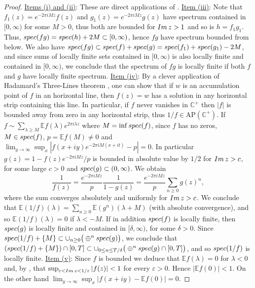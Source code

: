 \documentclass[a4paper,reqno,12pt]{amsart}
\newcommand{\E}{\mathcal{E}}
\renewcommand{\H}{\mathbb{C}^+}
\newcommand{\im}{{\rm Im}\,}
\newcommand{\la}{\lambda}
\newcommand{\ep}{\varepsilon}
\newcommand{\1}{{\bf 1}}
\newcommand{\apc}{\mathrm{AP}(\H)}
\renewcommand{\E}{\mathbb{E}}
\renewcommand{\1}{{\bo 1}}
\renewcommand{\Im}{{\rm Im}\,}
\newcommand{\spec}{{\rm spec}}
\begin{document}
\begin{proof}
\noindent \underline{Items (i) and (ii)}: These are direct applications of \cite[Thm. p. 162 \& p. 152]{Be}. \underline{Item (iii)}: Note that $f_1(z)=e^{-2\pi i M z}f(z)$ and $g_1(z)=e^{-2\pi i M z}g(z)$ have spectrum contained in $[0,\infty)$ for some $M>0$, thus both are bounded for $\Im z>1$ and so is $h=f_1g_1$. Thus, $\spec(fg)=\spec(h)+2M\subset [0,\infty)$, hence $fg$ have spectrum bounded from below. We also have $\spec(fg)\subset\spec(f)+\spec(g)=\spec(f_1)+\spec(g_1)-2M$, and since sums of locally finite sets contained in $[0,\infty)$ is also locally finite and contained in $[0,\infty)$, we conclude that the spectrum of $fg$ is locally finite if both $f$ and $g$ have locally finite spectrum. \underline{Item (iv)}: By a clever application of Hadamard's Three-Lines theorem  \cite[ Thm. 11, p. 139 \& Thm. 9, p. 144]{Be}, one can show that if $w$ is an accumulation point of $f$ in an horizontal line, then $f(z)=w$ has a solution in any horizontal strip containing this line.  In particular, if $f$ never vanishes in $\H$ then $|f|$ is bounded away from zero in any horizontal strip, thus $1/f\in \apc$. If $f\sim \sum_{\la\geq M} \E f(\la)e^{2\pi i\la z}$ where $M=\inf \spec(f)$, 
since $f$ has no zeros, $M\in \spec(f)$, $p=\E f(M)\neq 0$ and $\lim_{y\to \infty} \sup_x |f(x+iy)e^{-2\pi iM (x+it)}-p|=0$. In particular $g(z)=1-f(z)e^{-2\pi iM z}/p$ is bounded in absolute value by $1/2$ for $\im z> c$, for some large $c>0$ and $\spec(g)\subset (0,\infty)$. We obtain
$$
\frac{1}{f(z)} = \frac{e^{-2\pi iM z}}{p}\frac{1}{1-g(z)} = \frac{e^{-2\pi iM z}}{p} \sum_{n \geq 0} g(z)^n,
$$
where the sum converges absolutely and uniformly for $\Im z>c$. We conclude that $\E (1/f)(\la) = \sum_{n \geq 0} \E(g^n)(\la+M)$ (with absolute convergence), and so $\E(1/f)(\la)=0$ if $\la<-M$. If in addition $\spec(f)$ is locally finite, then $\spec(g)$ is locally finite and contained in $[\delta,\infty)$, for some $\delta>0$. Since $\spec(1/f)+\{M\}\subset\cup_{n\geq 0}\big(\oplus^n\spec(g)\big)$, we conclude that $(\spec(1/f)+\{M\})\cap [0,T] \subset \cup_{0\leq n \leq T/\delta}\big(\oplus^n\spec(g) \cap [0,T]\big)$, and so $\spec(1/f)$ is locally finite. \underline{Item (v)}: Since $f$ is bounded we deduce that $\E f(\la)=0$ for $\la<0$ and, by \cite[Thm. 9, p. 144]{Be}, that $\sup_{\ep < \im z <1/\ep} |f(z)|< 1$ for every $\ep>0$. Hence $|\E f(0)|<1$. On the other hand $\lim_{y\to \infty} \sup_x |f(x+iy)-\E f(0)|=0$.
\end{proof}
\end{document}
